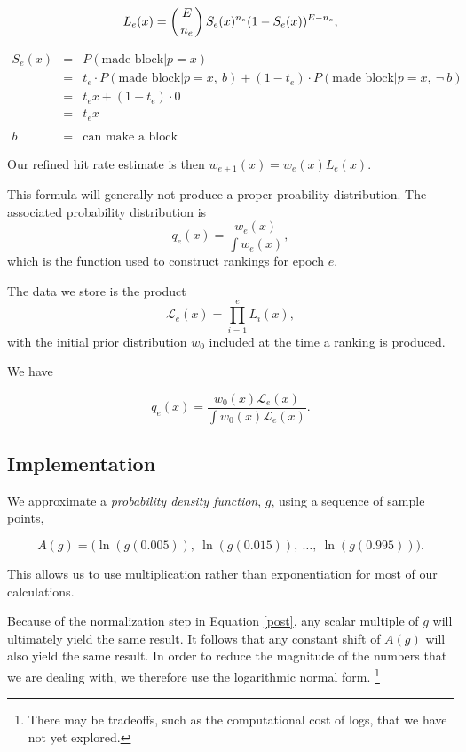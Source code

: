 \documentclass[11pt,a4paper,dvipsnames,twosided]{article}
\begin{document}
\[ L_e(x) = \left( E \atop n_e \right) S_e(x)^{n_e} (1-S_e(x))^{E - n_e}, \]

\[
\begin{array}{rcl}
  S_e(x) &=& P( \text{made block} | p = x) \\
         &=& t_e \cdot P( \text{made block} | p = x,~b) + (1-t_e) \cdot P( \text{made block} | p = x,~\neg~b) \\
         &=& t_ex                              + (1-t_e) \cdot 0 \\
         &=& t_ex \\
         \\
  b    &=& \text{can make a block}
\end{array}
\]

Our refined hit rate estimate is then $w_{e+1}(x) =w_e(x)L_e(x)$.

This formula will generally not produce a proper proability distribution. The associated probability distribution is
$$q_e(x)=\frac{w_e(x)}{\int w_e(x)},$$
which is the function used to construct rankings for epoch $e$.

The data we store is the product
$$\mathcal{L}_e(x) = \prod_{i=1}^e L_i(x),$$
with the initial prior distribution $w_0$ included at the time a ranking is produced.

We have

\begin{equation}
  \label{post}
  q_e(x) = \frac{w_0(x)\mathcal{L}_e(x)}{\int w_0(x)\mathcal{L}_e(x)}.
\end{equation}

\subsection{Implementation}

We approximate a \emph{probability density function}, $g$, using a sequence of sample points,

\[ A(g) = \big(\ln(g(0.005)),~ \ln(g(0.015)),~ \ldots,~ \ln(g(0.995))\big). \]

This allows us to use multiplication rather than exponentiation for most of our calculations.

Because of the normalization step in Equation \eqref{post}, any scalar multiple of $g$
will ultimately yield the same result. It follows that any constant shift of $A(g)$ will also yield the same result.
In order to reduce the magnitude of the numbers that we are dealing with, we therefore use the logarithmic normal form.
\footnote{There may be tradeoffs, such as the computational cost of logs, that we have not yet explored.}
\end{document}
